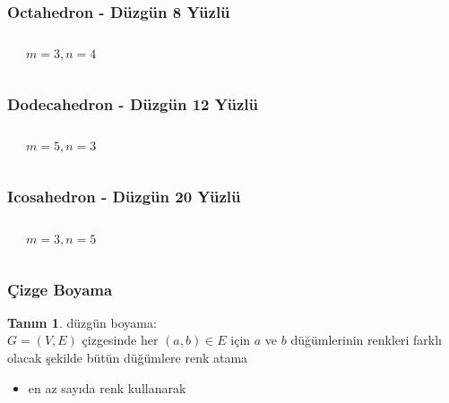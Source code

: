 \documentclass[dvipsnames]{beamer}
\theoremstyle{definition}
\newtheorem{tanim}[theorem]{Tanım}
\theoremstyle{example}
\theoremstyle{plain}
\begin{document}
\begin{frame}
  \frametitle{Octahedron - Düzgün 8 Yüzlü}

  \begin{columns}
    \begin{center}
    \end{center}

    \begin{center}

      $m=3, n=4$
    \end{center}
  \end{columns}
\end{frame}

\begin{frame}
  \frametitle{Dodecahedron - Düzgün 12 Yüzlü}

  \begin{columns}
    \begin{center}
    \end{center}

    \begin{center}

      $m=5, n=3$
    \end{center}
  \end{columns}
\end{frame}

\begin{frame}
  \frametitle{Icosahedron - Düzgün 20 Yüzlü}

  \begin{columns}
    \begin{center}
    \end{center}

    $m=3, n=5$
  \end{columns}
\end{frame}

\begin{frame}
  \frametitle{Çizge Boyama}

  \begin{tanim}
    \alert{düzgün boyama}:\\
      $G=(V,E)$ çizgesinde her $(a,b) \in E$ için $a$ ve $b$ düğümlerinin
      renkleri farklı olacak şekilde bütün düğümlere renk atama

    \pause
    \begin{itemize}
      \item en az sayıda renk kullanarak
    \end{itemize}
  \end{tanim}
\end{frame}
\end{document}
